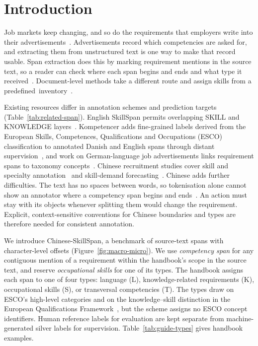 \section{Introduction}
\label{sec:intro}

Job markets keep changing, and so do the requirements that employers write into their advertisements~\citep{ILO_2020_OJVs_BigData,senger2024survey}. Advertisements record which competencies are asked for, and extracting them from unstructured text is one way to make that record usable. Span extraction does this by marking requirement mentions in the source text, so a reader can check where each span begins and ends and what type it received~\citep{gnehm2022skills}. Document-level methods take a different route and assign skills from a \mbox{predefined inventory~\citep{bhola2020retrieving}.}

Existing resources differ in annotation schemes and prediction targets (Table~\ref{tab:related-span}). English SkillSpan permits overlapping SKILL and KNOWLEDGE layers~\citep{zhang2022skillspan}. Kompetencer adds fine-grained labels derived from the European Skills, Competences, Qualifications and Occupations (ESCO) classification to annotated Danish and English spans through distant supervision~\citep{jensen2022kompetencer}, and work on German-language job advertisements links requirement spans to taxonomy concepts~\citep{gnehm2022skills}. Chinese recruitment studies cover skill and specialty annotation~\citep{cao2021occupational} and skill-demand forecasting~\citep{chen2024jobsdf}. Chinese adds further difficulties. The text has no spaces between words, so tokenisation alone cannot show an annotator where a competency span begins and ends~\citep{peng2015weibo,chen2021boundary}. An action must stay with its objects whenever splitting them would change the requirement. Explicit, context-sensitive conventions for Chinese boundaries and types are therefore needed for consistent annotation.

We introduce Chinese-SkillSpan, a benchmark of source-text spans with character-level offsets (Figure~\ref{fig:macro-micro}). We use \emph{competency span} for any contiguous mention of a requirement within the handbook's scope in the source text, and reserve \emph{occupational skills} for one of its types. The handbook assigns each span to one of four types: language (L), knowledge-related requirements (K), occupational skills (S), or transversal competencies (T). The types draw on ESCO's high-level categories and on the knowledge--skill distinction in the European Qualifications Framework~\citep{ESCOv1_2_2024,council2017eqf}, but the scheme assigns no ESCO concept identifiers. Human reference labels for evaluation are kept separate from machine-generated silver labels for supervision. Table~\ref{tab:guide-types} gives handbook examples.

